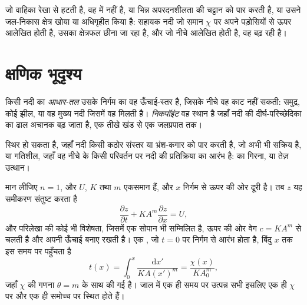 जो वाहिका रेखा से हटती है, वह  में नहीं है, या
भिन्न अपरदनशीलता की चट्टान को पार करती है, या उसने जल-निकास क्षेत्र खोया या अधिगृहीत किया है:
सहायक नदी जो समान $\chi$ पर अपने पड़ोसियों से ऊपर आलेखित होती है, उसका क्षेत्रफल
छीना जा रहा है, और जो नीचे आलेखित होती है, वह बढ़ रही है।

\section{क्षणिक भूदृश्य}\label{sec:b3:quantitative-geomorphology:transient}

\begin{definition}[आधार-तल और निकपॉइंट]\label{def:b3:quantitative-geomorphology:knickpoint}
किसी नदी का \emph{आधार-तल} उसके निर्गम का वह ऊँचाई-स्तर है,
जिसके नीचे वह काट नहीं सकती: समुद्र, कोई झील, या वह मुख्य नदी जिसमें वह
मिलती है। \emph{निकपॉइंट} वह स्थान है जहाँ नदी की दीर्घ-परिच्छेदिका का
ढाल अचानक बढ़ जाता है, एक तीखे खंड
से एक जलप्रपात तक।
\end{definition}

 स्थिर हो सकता है, जहाँ नदी किसी कठोर संस्तर या
भ्रंश-कगार को पार करती है, जो अभी भी सक्रिय है, या गतिशील, जहाँ वह
नीचे के किसी परिवर्तन पर नदी की प्रतिक्रिया का आरंभ है:  का गिरना, या तेज़
उत्थान।

\begin{theorem}[गतिज तरंगों के रूप में निकपॉइंट]\label{thm:b3:quantitative-geomorphology:kinematic}
मान लीजिए $n = 1$, और $U$, $K$ तथा $m$ एकसमान हैं, और $x$ निर्गम से
ऊपर की ओर दूरी है। तब $z$ यह समीकरण संतुष्ट करता है
\[
\frac{\partial z}{\partial t} + K A^m \frac{\partial z}{\partial x} = U ,
\]
और परिलेखा की कोई भी विशेषता, जिसमें एक सोपान भी सम्मिलित है, ऊपर की ओर
वेग $c = K A^m$ से चलती है और अपनी ऊँचाई बनाए रखती है। एक , जो
$t = 0$ पर निर्गम से आरंभ होता है, बिंदु $x$ तक इस समय पर पहुँचता है
\[
t(x) = \int_0^x \frac{\mathrm{d}x'}{K A(x')^m} = \frac{\chi(x)}{K A_0^m},
\]
जहाँ $\chi$ की गणना $\theta = m$ के साथ की गई है। जाल में एक ही समय पर उत्पन्न सभी 
इसलिए एक ही $\chi$ पर और एक ही समोच्च पर स्थित होते हैं।
\end{theorem}

